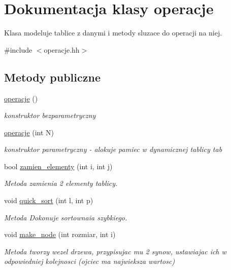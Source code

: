 \hypertarget{classoperacje}{\section{Dokumentacja klasy operacje}
\label{classoperacje}
}


Klasa modeluje tablice z danymi i metody sluzace do operacji na niej.  




{\ttfamily \#include $<$operacje.\-hh$>$}

\subsection*{Metody publiczne}
\begin{DoxyCompactItemize}
\item 
\hyperlink{classoperacje_a4538e0bfde26291449dc057134b23ad8}{operacje} ()
\begin{DoxyCompactList}\small\item\em konstruktor bezparametryczny \end{DoxyCompactList}\item 
\hyperlink{classoperacje_af109f7f9a4b10334d5e8c215c7f220de}{operacje} (int N)
\begin{DoxyCompactList}\small\item\em konstruktor parametryczny -\/ alokuje pamiec w dynamicznej tablicy {\ttfamily tab} \end{DoxyCompactList}\item 
bool \hyperlink{classoperacje_a7393a8b3b394921a084e0c1f4ad517b7}{zamien\-\_\-elementy} (int i, int j)
\begin{DoxyCompactList}\small\item\em Metoda zamienia 2 elementy tablicy. \end{DoxyCompactList}\item 
void \hyperlink{classoperacje_a7aa29c588e5a8f93c437150f03a133f1}{quick\-\_\-sort} (int l, int p)
\begin{DoxyCompactList}\small\item\em Metoda Dokonuje sortownaia szybkiego. \end{DoxyCompactList}\item 
void \hyperlink{classoperacje_a9be241905b909e7aef0151902c6f5b81}{make\-\_\-node} (int rozmiar, int i)
\begin{DoxyCompactList}\small\item\em Metoda tworzy wezel drzewa, przypisujac mu 2 synow, ustawiajac ich w odpowiedniej kolejnosci (ojciec ma najwieksza wartosc) \end{DoxyCompactList}\item 

\end{DoxyCompactItemize}

